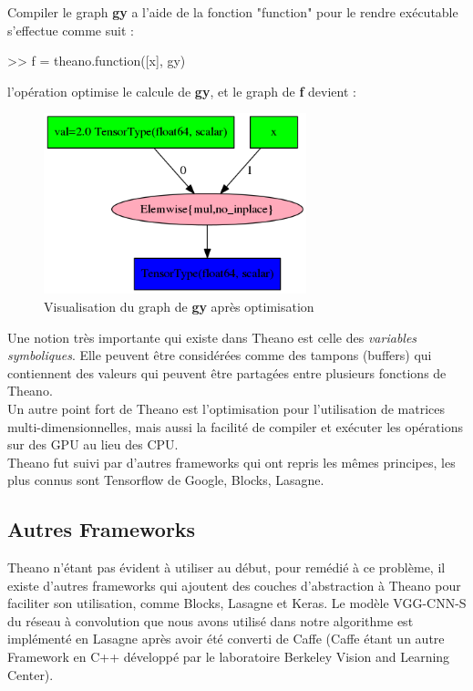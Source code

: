 Compiler le graph \textbf{gy} a l'aide de la fonction "function" pour le rendre exécutable s'effectue comme suit :

>> f = theano.function([x], gy)

l’opération optimise le calcule de \textbf{gy}, et le graph de \textbf{f} devient :

\begin{figure}[H]
	\centering
		\includegraphics[width=3in]{Figures/afterOptimization.png}
	\caption[TheanoGraph]{Visualisation du graph de \textbf{gy} après optimisation}
	\label{fig:Electron}
\end{figure}
 
	Une notion très importante qui existe dans Theano est celle des \textit{variables symboliques}. Elle peuvent être considérées comme des tampons (buffers) qui contiennent des valeurs qui peuvent être partagées entre plusieurs fonctions de Theano.\\

	Un autre point fort de Theano est l'optimisation pour l'utilisation de matrices multi-dimensionnelles, mais aussi la facilité de compiler et exécuter les opérations sur des GPU au lieu des CPU.\\

	Theano fut suivi par d'autres frameworks qui ont repris les mêmes principes, les plus connus sont Tensorflow de Google, Blocks, Lasagne.

\subsection{Autres Frameworks}
	Theano n'étant pas évident à utiliser au début, pour remédié à ce problème, il existe d'autres frameworks qui ajoutent des couches d'abstraction à Theano pour faciliter son utilisation, comme Blocks, Lasagne et Keras.
	Le modèle VGG-CNN-S du réseau à convolution que nous avons utilisé dans notre algorithme est implémenté en Lasagne après avoir été converti de Caffe (Caffe étant un autre Framework en C++ développé par le laboratoire Berkeley Vision and Learning Center).\\

